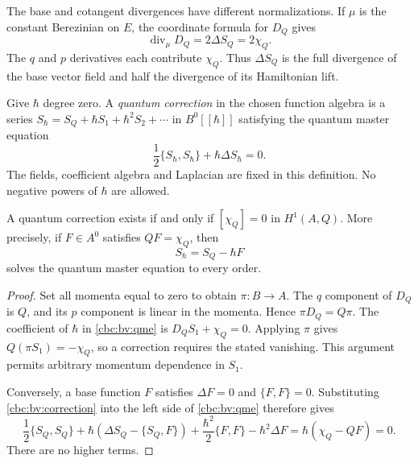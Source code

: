 The base and cotangent divergences have different normalizations.
If $\mu$ is the constant Berezinian on $E$, the coordinate formula for
$D_Q$ gives
\begin{equation}\label{cbc:bv:half-divergence}
 \operatorname{div}_{\mu}D_Q=2\Delta S_Q=2\chi_Q.
\end{equation}
The $q$ and $p$ derivatives each contribute $\chi_Q$.
Thus $\Delta S_Q$ is the full divergence of the base vector field and
half the divergence of its Hamiltonian lift.

Give $\hbar$ degree zero.  A \emph{quantum correction} in the chosen
function algebra is a series
$S_\hbar=S_Q+\hbar S_1+\hbar^2S_2+\cdots$ in $B^0[[\hbar]]$
satisfying the quantum master equation
\begin{equation}\label{cbc:bv:qme}
 \frac12\{S_\hbar,S_\hbar\}+\hbar\Delta S_\hbar=0.
\end{equation}
The fields, coefficient algebra and Laplacian are fixed in this
definition.  No negative powers of $\hbar$ are allowed.

\begin{theorem}\label{cbc:bv:criterion}
A quantum correction exists if and only if
$[\chi_Q]=0$ in $H^1(A,Q)$.  More precisely, if $F\in A^0$ satisfies
$QF=\chi_Q$, then
\begin{equation}\label{cbc:bv:correction}
 S_\hbar=S_Q-\hbar F
\end{equation}
solves the quantum master equation to every order.
\end{theorem}
\begin{proof}
Set all momenta equal to zero to obtain $\pi:B\to A$.
The $q$ component of $D_Q$ is $Q$, and its $p$ component is linear
in the momenta.  Hence $\pi D_Q=Q\pi$.
The coefficient of $\hbar$ in \eqref{cbc:bv:qme} is
$D_QS_1+\chi_Q=0$.  Applying $\pi$ gives
$Q(\pi S_1)=-\chi_Q$, so a correction requires the stated vanishing.
This argument permits arbitrary momentum dependence in $S_1$.

Conversely, a base function $F$ satisfies
$\Delta F=0$ and $\{F,F\}=0$.  Substituting
\eqref{cbc:bv:correction} into the left side of \eqref{cbc:bv:qme}
therefore gives
\[
 \frac12\{S_Q,S_Q\}
 +\hbar(\Delta S_Q-\{S_Q,F\})
 +\frac{\hbar^2}{2}\{F,F\}-\hbar^2\Delta F
 =\hbar(\chi_Q-QF)=0.
\]
There are no higher terms.
\end{proof}

